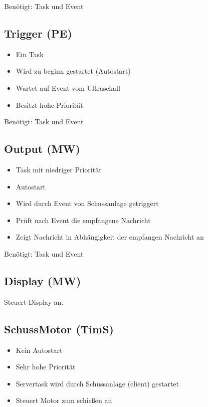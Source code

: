 \documentclass[a4paper,11pt]{scrreprt}
\begin{document}
Benötigt: Task und Event

\subsection*{Trigger (PE)}

\begin{itemize}
 \item Ein Task
 \item Wird zu beginn gestartet (Autostart)
 \item Wartet auf Event vom Ultraschall
 \item Besitzt hohe Priorität
\end{itemize}

Benötigt: Task und Event

\subsection*{Output (MW)}

\begin{itemize}
 \item Task mit niedriger Priorität
 \item Autostart
 \item Wird durch Event von Schussanlage getriggert
 \item Prüft nach Event die empfangene Nachricht
 \item Zeigt Nachricht in Abhängigkeit der empfangen Nachricht an
\end{itemize}

Benötigt: Task und Event

\subsection*{Display (MW)}

Steuert Display an.


\subsection*{SchussMotor (TimS)}

\begin{itemize}
 \item Kein Autostart
 \item Sehr hohe Priorität
 \item Servertask wird durch Schussanlage (client) gestartet
 \item Steuert Motor zum schießen an
\end{itemize}
\end{document}
